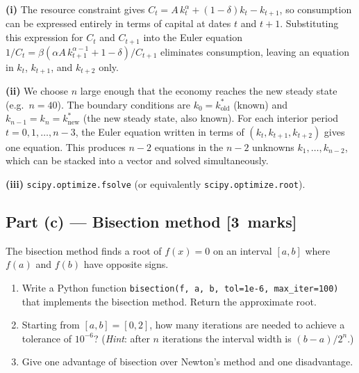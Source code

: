 \documentclass[11pt,a4paper]{article}
\newcommand{\mkpts}[1]{\hfill\textbf{[#1~marks]}}
\begin{document}
\begin{solution}
\textbf{(i)} The resource constraint gives $C_t = A\,k_t^\alpha + (1-\delta)k_t - k_{t+1}$, so consumption can be expressed entirely in terms of capital at dates $t$ and $t{+}1$.  Substituting this expression for $C_t$ and $C_{t+1}$ into the Euler equation $1/C_t = \beta(\alpha A\,k_{t+1}^{\alpha-1}+1-\delta)/C_{t+1}$ eliminates consumption, leaving an equation in $k_t$, $k_{t+1}$, and $k_{t+2}$ only.

\medskip

\textbf{(ii)} We choose $n$ large enough that the economy reaches the new steady state (e.g.\ $n=40$).  The boundary conditions are $k_0 = k^*_{\text{old}}$ (known) and $k_{n-1} = k_n = k^*_{\text{new}}$ (the new steady state, also known).  For each interior period $t = 0, 1, \ldots, n{-}3$, the Euler equation written in terms of $(k_t, k_{t+1}, k_{t+2})$ gives one equation.  This produces $n{-}2$ equations in the $n{-}2$ unknowns $k_1, \ldots, k_{n-2}$, which can be stacked into a vector and solved simultaneously.

\medskip

\textbf{(iii)} \texttt{scipy.optimize.fsolve} (or equivalently \texttt{scipy.optimize.root}).
\end{solution}

\subsection*{Part (c) --- Bisection method \mkpts{3}}

The bisection method finds a root of $f(x) = 0$ on an interval $[a,b]$ where $f(a)$ and $f(b)$ have opposite signs.

\begin{enumerate}[label=(\roman*),nosep]
\item Write a Python function \texttt{bisection(f, a, b, tol=1e-6, max\_iter=100)} that implements the bisection method.  Return the approximate root.
\item Starting from $[a,b] = [0, 2]$, how many iterations are needed to achieve a tolerance of $10^{-6}$?  (\textit{Hint}: after $n$ iterations the interval width is $(b-a)/2^n$.)
\item Give one advantage of bisection over Newton's method and one disadvantage.
\end{enumerate}
\end{document}
